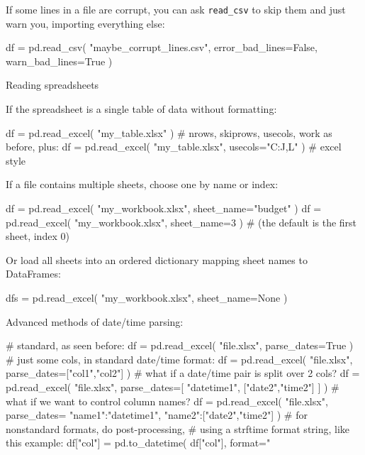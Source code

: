 \documentclass[a4paper,landscape,columns=3]{cheatsheet}
\def\sect#1{\begin{tcolorbox}[colback=blue!5!white,colframe=blue!75!black,size=title,leftrule=2mm]
    \large #1
\end{tcolorbox}}
\begin{document}
If some lines in a file are corrupt, you can ask \lstinline{read_csv} to skip them and just warn you, importing everything else:
\begin{python}
df = pd.read_csv( "maybe_corrupt_lines.csv",
                  error_bad_lines=False,
                  warn_bad_lines=True )
\end{python}

\sect{Reading spreadsheets}

If the spreadsheet is a single table of data without formatting:
\begin{python}
df = pd.read_excel( "my_table.xlsx" )
# nrows, skiprows, usecols, work as before, plus:
df = pd.read_excel( "my_table.xlsx",
                    usecols="C:J,L" )  # excel style
\end{python}

If a file contains multiple sheets, choose one by name or index:
\begin{python}
df = pd.read_excel( "my_workbook.xlsx",
                    sheet_name="budget" )
df = pd.read_excel( "my_workbook.xlsx",
                    sheet_name=3 )
# (the default is the first sheet, index 0)
\end{python}

Or load all sheets into an ordered dictionary mapping sheet names to DataFrames:
\begin{python}
dfs = pd.read_excel( "my_workbook.xlsx",
                     sheet_name=None )
\end{python}

Advanced methods of date/time parsing:
\begin{python}
# standard, as seen before:
df = pd.read_excel( "file.xlsx",
                    parse_dates=True )
# just some cols, in standard date/time format:
df = pd.read_excel( "file.xlsx",
                    parse_dates=["col1","col2"] )
# what if a date/time pair is split over 2 cols?
df = pd.read_excel( "file.xlsx",
                    parse_dates=[
                        "datetime1",
                        ["date2","time2"]
                    ] )
# what if we want to control column names?
df = pd.read_excel( "file.xlsx",
                    parse_dates={
                        "name1":"datetime1",
                        "name2":["date2","time2"]
                    } )
# for nonstandard formats, do post-processing,
# using a strftime format string, like this example:
df["col"] = pd.to_datetime( df["col"],
    format="%
\end{python}
\end{document}
